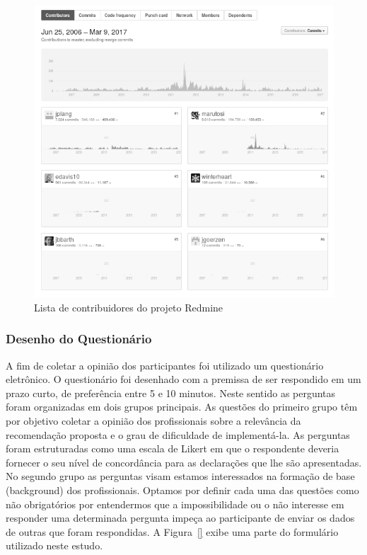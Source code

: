 \begin{figure}[htpb]
	\centering
	\includegraphics[width=0.8\linewidth]{./chapter-sugestoes-melhorias-fgrm/img/redmine_contribuidores.png}
	\caption{Lista de contribuidores do projeto Redmine}
\label{fig:redmine_contribuidores}
\end{figure}

\subsubsection{Desenho do Questionário}
\label{ssub:sug_melhoria_desenho_questionario}

A fim de coletar a opinião dos participantes foi utilizado um questionário
eletrônico. O questionário foi desenhado com a premissa de ser respondido em um
prazo curto, de preferência entre 5 e 10 minutos. Neste sentido as perguntas
foram organizadas em dois grupos principais.  As questões do primeiro grupo têm
por objetivo coletar a opinião dos profissionais sobre a relevância da
recomendação proposta e o grau de dificuldade de implementá-la. As perguntas
foram estruturadas como uma escala de Likert em que o respondente deveria
fornecer o seu nível de concordância para as declarações que lhe são
apresentadas. No segundo grupo as perguntas visam estamos interessados na
formação de base (background) dos profissionais. Optamos por definir cada uma
das questões como não obrigatórios por entendermos que a impossibilidade ou o
não interesse em responder uma determinada pergunta impeça ao participante de
enviar os dados de outras que foram respondidas. A Figura~\ref{} exibe uma parte
do formulário utilizado neste estudo.


